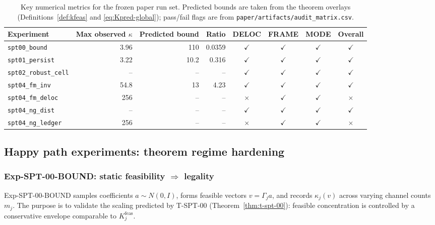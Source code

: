 \documentclass[11pt]{article}
\begin{document}
\begin{table}[t]
\centering
\small
\caption{Key numerical metrics for the frozen paper run set. Predicted bounds are taken from the theorem overlays (Definitions~\ref{def:kfeas} and \eqref{eq:Kpred-global}); pass/fail flags are from \texttt{paper/artifacts/audit\_matrix.csv}.}
\label{tab:key-metrics}
\setlength{\tabcolsep}{5pt}\begin{tabular}{@{}lrrrcccc@{}}
\toprule
Experiment & Max observed $\kappa$ & Predicted bound & Ratio & DELOC & FRAME & MODE & Overall \\
\midrule
\texttt{spt00\_bound} & 3.96 & 110 & 0.0359 & \(\checkmark\) & \(\checkmark\) & \(\checkmark\) & \(\checkmark\) \\
\texttt{spt01\_persist} & 3.22 & 10.2 & 0.316 & \(\checkmark\) & \(\checkmark\) & \(\checkmark\) & \(\checkmark\) \\
\texttt{spt02\_robust\_cell} & -- & -- & -- & \(\checkmark\) & \(\checkmark\) & \(\checkmark\) & \(\checkmark\) \\
\texttt{spt04\_fm\_inv} & 54.8 & 13 & 4.23 & \(\checkmark\) & \(\checkmark\) & \(\checkmark\) & \(\checkmark\) \\
\texttt{spt04\_fm\_deloc} & 256 & -- & -- & \(\times\) & \(\checkmark\) & \(\checkmark\) & \(\times\) \\
\texttt{spt04\_ng\_dist} & -- & -- & -- & \(\checkmark\) & \(\checkmark\) & \(\checkmark\) & \(\checkmark\) \\
\texttt{spt04\_ng\_ledger} & 256 & -- & -- & \(\times\) & \(\checkmark\) & \(\checkmark\) & \(\times\) \\
\bottomrule
\end{tabular}
\end{table}
 
\subsection{Happy path experiments: theorem regime hardening}

\subsubsection{Exp-SPT-00-BOUND: static feasibility $\Rightarrow$ legality}

Exp-SPT-00-BOUND samples coefficients $a\sim N(0,I)$, forms feasible vectors $v=\Gamma_j a$, and records $\kappa_j(v)$ across varying channel counts $m_j$.
The purpose is to validate the scaling predicted by T-SPT-00 (Theorem~\ref{thm:t-spt-00}): feasible concentration is controlled by a conservative envelope comparable to $K^{\mathrm{feas}}_j$.
\end{document}
